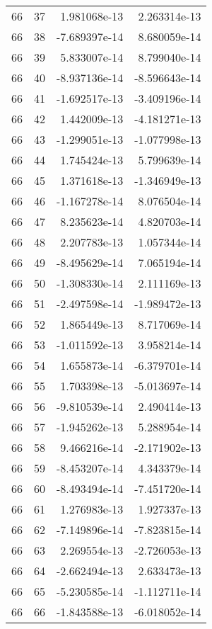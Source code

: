 \begin{tabular}{rrrr}
  66 &   37 &  1.981068e-13 &  2.263314e-13 \\
  66 &   38 & -7.689397e-14 &  8.680059e-14 \\
  66 &   39 &  5.833007e-14 &  8.799040e-14 \\
  66 &   40 & -8.937136e-14 & -8.596643e-14 \\
  66 &   41 & -1.692517e-13 & -3.409196e-14 \\
  66 &   42 &  1.442009e-13 & -4.181271e-13 \\
  66 &   43 & -1.299051e-13 & -1.077998e-13 \\
  66 &   44 &  1.745424e-13 &  5.799639e-14 \\
  66 &   45 &  1.371618e-13 & -1.346949e-13 \\
  66 &   46 & -1.167278e-14 &  8.076504e-14 \\
  66 &   47 &  8.235623e-14 &  4.820703e-14 \\
  66 &   48 &  2.207783e-13 &  1.057344e-14 \\
  66 &   49 & -8.495629e-14 &  7.065194e-14 \\
  66 &   50 & -1.308330e-14 &  2.111169e-13 \\
  66 &   51 & -2.497598e-14 & -1.989472e-13 \\
  66 &   52 &  1.865449e-13 &  8.717069e-14 \\
  66 &   53 & -1.011592e-13 &  3.958214e-14 \\
  66 &   54 &  1.655873e-14 & -6.379701e-14 \\
  66 &   55 &  1.703398e-13 & -5.013697e-14 \\
  66 &   56 & -9.810539e-14 &  2.490414e-13 \\
  66 &   57 & -1.945262e-13 &  5.288954e-14 \\
  66 &   58 &  9.466216e-14 & -2.171902e-13 \\
  66 &   59 & -8.453207e-14 &  4.343379e-14 \\
  66 &   60 & -8.493494e-14 & -7.451720e-14 \\
  66 &   61 &  1.276983e-13 &  1.927337e-13 \\
  66 &   62 & -7.149896e-14 & -7.823815e-14 \\
  66 &   63 &  2.269554e-13 & -2.726053e-13 \\
  66 &   64 & -2.662494e-13 &  2.633473e-13 \\
  66 &   65 & -5.230585e-14 & -1.112711e-14 \\
  66 &   66 & -1.843588e-13 & -6.018052e-14 \\

\end{tabular}
